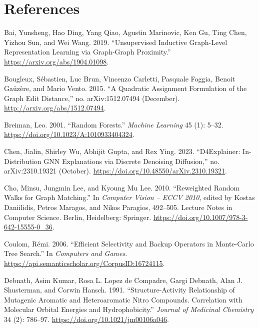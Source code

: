 \documentclass[
  11pt,
  letterpaper,
]{article}
\newlength{\cslhangindent}
\newlength{\cslentryspacingunit} %
\newenvironment{CSLReferences}[2] %
 {%
  \setlength{\parindent}{0pt}
  \ifodd #1
  \let\oldpar\par
  \def\par{\hangindent=\cslhangindent\oldpar}
  \fi
  \setlength{\parskip}{#2\cslentryspacingunit}
 }%
 {}
\begin{document}
\pagebreak

\hypertarget{references}{%
\section{References}\label{references}}

\hypertarget{refs}{}
\begin{CSLReferences}{1}{0}
\leavevmode{}%
Bai, Yunsheng, Hao Ding, Yang Qiao, Agustin Marinovic, Ken Gu, Ting
Chen, Yizhou Sun, and Wei Wang. 2019. {``Unsupervised Inductive
Graph-Level Representation Learning via Graph-Graph Proximity.''}
\url{https://arxiv.org/abs/1904.01098}.

\leavevmode{}%
Bougleux, Sébastien, Luc Brun, Vincenzo Carletti, Pasquale Foggia,
Benoit Gaüzère, and Mario Vento. 2015. {``A Quadratic Assignment
Formulation of the Graph Edit Distance,''} no. arXiv:1512.07494
(December). \url{http://arxiv.org/abs/1512.07494}.

\leavevmode{}%
Breiman, Leo. 2001. {``Random Forests.''} \emph{Machine Learning} 45
(1): 5--32. \url{https://doi.org/10.1023/A:1010933404324}.

\leavevmode{}%
Chen, Jialin, Shirley Wu, Abhijit Gupta, and Rex Ying. 2023.
{``D4Explainer: In-Distribution GNN Explanations via Discrete Denoising
Diffusion,''} no. arXiv:2310.19321 (October).
\url{https://doi.org/10.48550/arXiv.2310.19321}.

\leavevmode{}%
Cho, Minsu, Jungmin Lee, and Kyoung Mu Lee. 2010. {``Reweighted Random
Walks for Graph Matching.''} In \emph{Computer Vision -- ECCV 2010},
edited by Kostas Daniilidis, Petros Maragos, and Nikos Paragios,
492--505. Lecture Notes in Computer Science. Berlin, Heidelberg:
Springer. \url{https://doi.org/10.1007/978-3-642-15555-0_36}.

\leavevmode{}%
Coulom, Rémi. 2006. {``Efficient Selectivity and Backup Operators in
Monte-Carlo Tree Search.''} In \emph{Computers and Games}.
\url{https://api.semanticscholar.org/CorpusID:16724115}.

\leavevmode{}%
Debnath, Asim Kumar, Rosa L. Lopez de Compadre, Gargi Debnath, Alan J.
Shusterman, and Corwin Hansch. 1991. {``Structure-Activity Relationship
of Mutagenic Aromatic and Heteroaromatic Nitro Compounds. Correlation
with Molecular Orbital Energies and Hydrophobicity.''} \emph{Journal of
Medicinal Chemistry} 34 (2): 786--97.
\url{https://doi.org/10.1021/jm00106a046}.


\end{CSLReferences}
\end{document}
